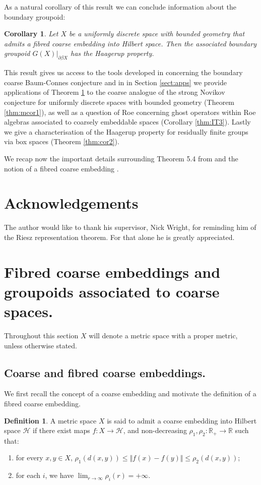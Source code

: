 \documentclass[11pt]{amsart}
\theoremstyle{plain}
\newtheorem{corollary}[theorem]{Corollary}%
\theoremstyle{definition}%
\newtheorem{definition}[theorem]{Definition}%
\theoremstyle{remark}%
\begin{document}
As a natural corollary of this result we can conclude information about the boundary groupoid:

\begin{corollary}\label{Thm:MT1}
Let $X$ be a uniformly discrete space with bounded geometry that admits a fibred coarse embedding into Hilbert space. Then the associated boundary groupoid $G(X)|_{\partial\beta X}$ has the Haagerup property.
\end{corollary}

This result gives us access to the tools developed in \cite{mypub1} concerning the boundary coarse Baum-Connes conjecture and in in Section \ref{sect:apps} we provide applications of Theorem \ref{Thm:MT1} to the coarse analogue of the strong Novikov conjecture for uniformly discrete spaces with bounded geometry (Theorem \ref{thm:mcor1}), as well as a question of Roe concerning ghost operators within Roe algebras associated to coarsely embeddable spaces (Corollary \ref{thm:IT3}). Lastly we give a characterisation of the Haagerup property for residually finite groups via box spaces (Theorem \ref{thm:cor2}).

We recap now the important details surrounding Theorem 5.4 from \cite{MR1905840} and the notion of a fibred coarse embedding \cite{FCEpaper}.

\section*{Acknowledgements}
The author would like to thank his supervisor, Nick Wright, for reminding him of the Riesz representation theorem. For that alone he is greatly appreciated.

\section{Fibred coarse embeddings and groupoids associated to coarse spaces.}\label{sect:coarse}
Throughout this section $X$ will denote a metric space with a proper metric, unless otherwise stated.

\subsection{Coarse and fibred coarse embeddings.}
We first recall the concept of a coarse embedding and motivate the definition of a fibred coarse embedding.

\begin{definition}\label{def:FCE}
A metric space $X$ is said to admit a coarse embedding into Hilbert space $\mathcal{H}$ if there exist maps $f:X \rightarrow \mathcal{H}$,  and non-decreasing $\rho_{1},\rho_{2}:\mathbb{R}_{+} \rightarrow \mathbb{R}$ such that:
\begin{enumerate}
\item for every $x,y \in X$, $\rho_{1}(d(x,y)) \leq \Vert f(x) - f(y) \Vert \leq \rho_{2}(d(x,y))$;
\item for each $i$, we have $\lim_{r \rightarrow \infty}\rho_{i}(r) = +\infty$.
\end{enumerate}
\end{definition}
\end{document}
